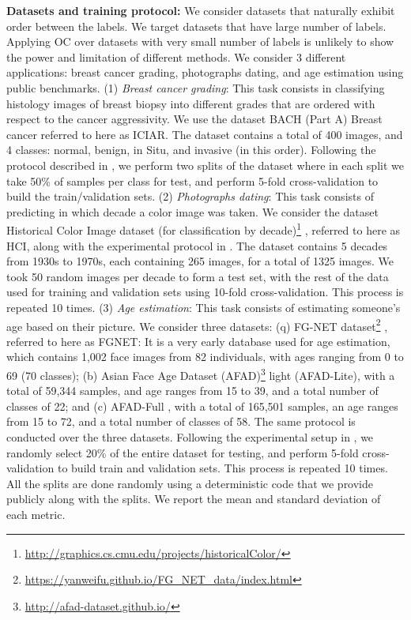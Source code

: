\documentclass[8pt]{article}
\theoremstyle{definition}
\begin{document}
\noindent  \textbf{Datasets and training protocol:}
We consider datasets that naturally exhibit order between the labels.  We target datasets that have large number of labels. Applying OC over datasets with very small number of labels is unlikely to show the power and limitation of different methods. We consider 3 different applications: breast cancer grading, photographs dating, and age estimation using public benchmarks.
(1) \emph{Breast cancer grading}: This task consists in classifying histology images of breast biopsy into different grades that are ordered with respect to the cancer aggressivity. We use the dataset BACH (Part A) Breast cancer \citep{aresta2018bach} referred to here as ICIAR. The dataset contains a total of 400 images, and 4 classes: normal, benign, in Situ, and invasive (in this order). Following the protocol described in \citep{belharbi2019wsolentropy,rony2019weak-loc-histo-survey}, we perform two splits of the dataset where in each split we take 50\% of samples per class for test, and perform 5-fold cross-validation to build the train/validation sets.
(2) \emph{Photographs dating}: This task consists of predicting in which decade a color image was taken. We consider the dataset Historical Color Image dataset (for classification by decade)\footnote{\url{http://graphics.cs.cmu.edu/projects/historicalColor/}} \citep{palermo2012datingdataset}, referred to here as HCI, along with the experimental protocol in \citep{palermo2012datingdataset}. The dataset contains 5 decades from 1930s to 1970s, each containing 265 images, for a total of 1325 images. We took 50 random images per decade to form a test set, with the rest of the data used for training and validation sets using 10-fold cross-validation. This process is repeated 10 times.
(3) \emph{Age estimation}: This task consists of estimating someone's age based on their picture. We consider three datasets:
(q) FG-NET dataset\footnote{\url{https://yanweifu.github.io/FG\_NET\_data/index.html}} \citep{panis2016overview}, referred to here as FGNET: It is a very early database used for age estimation, which contains 1,002 face images from 82 individuals, with ages ranging from 0 to 69 (70 classes);
(b) Asian Face Age Dataset (AFAD)\footnote{\url{http://afad-dataset.github.io/}} \citep{niu2016ordinal} light (AFAD-Lite), with a total of 59,344 samples, and age ranges from 15 to 39, and a total number of classes of 22; and
(c) AFAD-Full \citep{niu2016ordinal}, with a total of 165,501 samples, an age ranges from 15 to 72, and a total number of classes of 58. The same protocol is conducted over the three datasets. Following the experimental setup in \citep{chang2011ordinal,chen2013cumulative,niu2016ordinal,wang2015deeply}, we randomly select 20\% of the entire dataset for testing, and perform 5-fold cross-validation to build train and validation sets. This process is repeated 10 times. All the splits are done randomly using a deterministic code that we provide publicly along with the splits. We report the mean and standard deviation of each metric.
\end{document}
